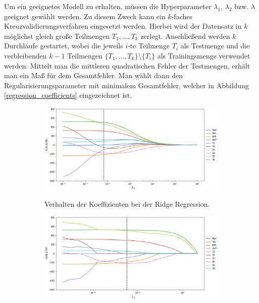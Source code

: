 Um ein geeignetes Modell zu erhalten, müssen die Hyperparameter $\lambda_1$, $\lambda_2$ bzw. $\lambda$ geeignet gewählt werden. Zu diesem Zweck kann ein $k$-faches Kreuzvalidierungsverfahren eingesetzt werden. Hierbei wird der Datensatz in $k$ möglichst gleich große Teilmengen $T_1, \ldots, T_k$ zerlegt. Anschließend werden $k$ Durchläufe gestartet, wobei die jeweils $i$-te Teilmenge $T_{i}$ als Testmenge und die verbleibenden $k-1$ Teilmengen $\{T_{1},...,T_{k}\}\setminus \{T_{i}\}$ als Trainingsmenge verwendet werden. Mittelt man die mittleren quadratischen Fehler der Testmengen, erhält man ein Maß für dem Gesamtfehler. Man wählt dann den Regularisierungsparameter mit minimalem Gesamtfehler, welcher in Abbildung \ref{regression_coefficients} eingezeichnet ist.

\begin{figure}
\centering
	\begin{subfigure}{0.875\textwidth}
	\centering
	\includegraphics[width = \textwidth]{figures/ridge_regression_coefficients_cv.jpg}
	\label{ridge_regression_coefficients}
	\vspace{-0.5cm}
	\caption{Verhalten der Koeffizienten bei der Ridge Regression.}
	\vspace{0.5cm}
	\end{subfigure}
	\begin{subfigure}{0.875\textwidth}
	\centering
	\includegraphics[width = \textwidth]{figures/lasso_regression_coefficients_cv.jpg}

\end{subfigure}
\end{figure}
